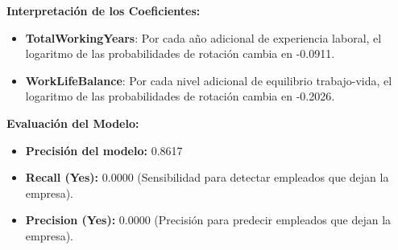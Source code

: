 \textbf{Interpretación de los Coeficientes:}
\begin{itemize}
    \item \textbf{TotalWorkingYears}: Por cada año adicional de experiencia laboral, el logaritmo de las probabilidades de rotación cambia en -0.0911. 
    \item \textbf{WorkLifeBalance}: Por cada nivel adicional de equilibrio trabajo-vida, el logaritmo de las probabilidades de rotación cambia en -0.2026.
\end{itemize}


\textbf{Evaluación del Modelo:}
\begin{itemize}
    \item \textbf{Precisión del modelo:} 0.8617
    \item \textbf{Recall (Yes):} 0.0000 (Sensibilidad para detectar empleados que dejan la empresa).
    \item \textbf{Precision (Yes):} 0.0000 (Precisión para predecir empleados que dejan la empresa).
\end{itemize}
